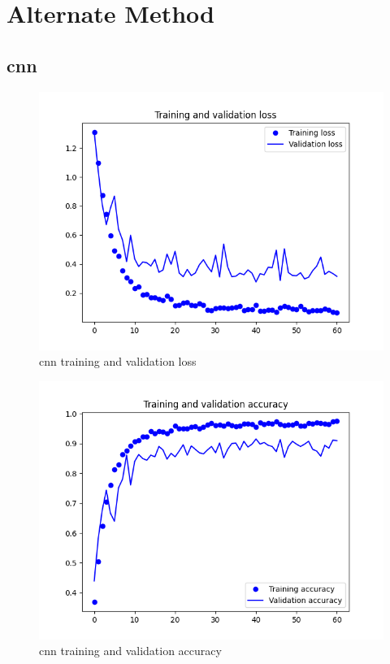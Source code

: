 \documentclass[10pt,twocolumn,letterpaper]{article}
\begin{document}
\section{Alternate Method}
\label{sec:alt_method}

\subsection{\acrlong{cnn}}

\begin{figure}[H]
  \centering
   \includegraphics[width=0.9\linewidth, trim={3em, 2em, 4em, 4em}, clip]{cnn_loss}
   \caption{\acrshort{cnn} training and validation loss}
   \label{fig:cnn_loss}
\end{figure}

\begin{figure}[H]
  \centering
   \includegraphics[width=0.9\linewidth, trim={3em, 2em, 4em, 4em}, clip]{cnn_accuracy}
   \caption{\acrshort{cnn} training and validation accuracy}
   \label{fig:cnn_accuracy}
\end{figure}
\end{document}
